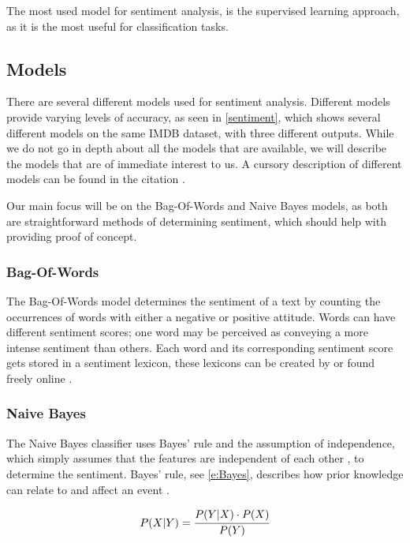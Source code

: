 The most used model for sentiment analysis, is the supervised learning approach,
as it is the most useful for classification tasks.

\subsection{Models}\label{subsub:Models}
There are several different models used for sentiment analysis. Different models
provide varying levels of accuracy, as seen in \autoref{sentiment}, which shows
several different models on the same IMDB dataset, with three different outputs.
While we do not go in depth about all the models that are available, we will
describe the models that are of immediate interest to us. A cursory description
of different models can be found in the citation \citep{Classification}.


Our main focus will be on the Bag-Of-Words and Naive Bayes models, as both
are straightforward methods of determining sentiment, which should help with
providing proof of concept.

\subsubsection{Bag-Of-Words}
The Bag-Of-Words model determines the sentiment of a text by counting the
occurrences of words with either a negative or positive attitude. Words can have
different sentiment scores; one word may be perceived as conveying a more
intense sentiment than others. Each word and its corresponding sentiment score
gets stored in a sentiment lexicon, these lexicons can be created by or found
freely online \citep{BagOfWords}.


\subsubsection{Naive Bayes} 
The Naive Bayes classifier uses Bayes' rule and the assumption of independence,
which simply assumes that the features are independent of each other
\citep[Proposition 6.5]{MIBook}, to determine the sentiment. Bayes' rule, see
\autoref{e:Bayes}, describes how prior knowledge can relate to and affect an
event \citep[P.229]{MIBook}. 

\begin{equation}\label{e:Bayes}
P(X|Y) = \cfrac{P(Y|X) \cdot P(X)}{P(Y)}
\end{equation}


